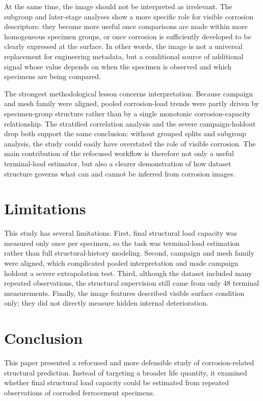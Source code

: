 \documentclass[conference]{IEEEtran}
\begin{document}
At the same time, the image should not be interpreted as irrelevant. The subgroup and later-stage analyses show a more specific role for visible corrosion descriptors: they become more useful once comparisons are made within more homogeneous specimen groups, or once corrosion is sufficiently developed to be clearly expressed at the surface. In other words, the image is not a universal replacement for engineering metadata, but a conditional source of additional signal whose value depends on when the specimen is observed and which specimens are being compared.

The strongest methodological lesson concerns interpretation. Because campaign and mesh family were aligned, pooled corrosion-load trends were partly driven by specimen-group structure rather than by a single monotonic corrosion-capacity relationship. The stratified correlation analysis and the severe campaign-holdout drop both support the same conclusion: without grouped splits and subgroup analysis, the study could easily have overstated the role of visible corrosion. The main contribution of the refocused workflow is therefore not only a useful terminal-load estimator, but also a clearer demonstration of how dataset structure governs what can and cannot be inferred from corrosion images.

\section{Limitations}
This study has several limitations. First, final structural load capacity was measured only once per specimen, so the task was terminal-load estimation rather than full structural-history modeling. Second, campaign and mesh family were aligned, which complicated pooled interpretation and made campaign holdout a severe extrapolation test. Third, although the dataset included many repeated observations, the structural supervision still came from only 48 terminal measurements. Finally, the image features described visible surface condition only; they did not directly measure hidden internal deterioration.

\section{Conclusion}
This paper presented a refocused and more defensible study of corrosion-related structural prediction. Instead of targeting a broader life quantity, it examined whether final structural load capacity could be estimated from repeated observations of corroded ferrocement specimens.
\end{document}
